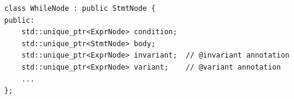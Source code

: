 \begin{lstlisting}[style=cpp, caption={Nodo WhileNode con soporte de invariante}]
class WhileNode : public StmtNode {
public:
    std::unique_ptr<ExprNode> condition;
    std::unique_ptr<StmtNode> body;
    std::unique_ptr<ExprNode> invariant;  // @invariant annotation
    std::unique_ptr<ExprNode> variant;    // @variant annotation
    ...
};
\end{lstlisting}
